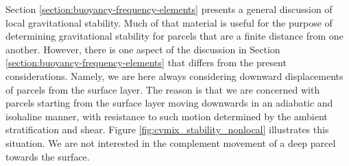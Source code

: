 Section \ref{section:buoyancy-frequency-elements} presents a general
discussion of local gravitational stability.  Much of that material is
useful for the purpose of determining gravitational stability for
parcels that are a finite distance from one another.  However, there
is one aspect of the discussion in Section
\ref{section:buoyancy-frequency-elements} that differs from the
present considerations.  Namely, we are here always considering
downward displacements of parcels from the surface layer.  The reason
is that we are concerned with parcels starting from the surface layer
moving downwards in an adiabatic and isohaline manner, with resistance
to such motion determined by the ambient stratification and shear.
Figure \ref{fig:cvmix_stability_nonlocal} illustrates this situation.
We are not interested in the complement movement of a deep parcel
towards the surface.


